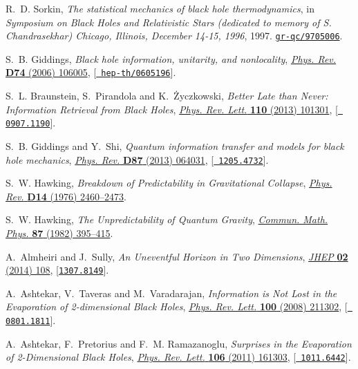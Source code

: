 \documentclass[12pt]{article}
\begin{document}
\begin{thebibliography}{100}
R.~D. Sorkin, \emph{{The statistical mechanics of black hole thermodynamics}},
  in \emph{{Symposium on Black Holes and Relativistic Stars (dedicated to
  memory of S. Chandrasekhar) Chicago, Illinois, December 14-15, 1996}}, 1997.
\newblock \href{http://arxiv.org/abs/gr-qc/9705006}{{\tt gr-qc/9705006}}.

S.~B. Giddings, \emph{{Black hole information, unitarity, and nonlocality}},
  \href{http://dx.doi.org/10.1103/PhysRevD.74.106005}{\emph{Phys. Rev.} {\bf
  D74} (2006) 106005}, [\href{http://arxiv.org/abs/hep-th/0605196}{{\tt
  hep-th/0605196}}].

S.~L. Braunstein, S.~Pirandola and K.~Życzkowski, \emph{{Better Late than
  Never: Information Retrieval from Black Holes}},
  \href{http://dx.doi.org/10.1103/PhysRevLett.110.101301}{\emph{Phys. Rev.
  Lett.} {\bf 110} (2013) 101301}, [\href{http://arxiv.org/abs/0907.1190}{{\tt
  0907.1190}}].

S.~B. Giddings and Y.~Shi, \emph{{Quantum information transfer and models for
  black hole mechanics}},
  \href{http://dx.doi.org/10.1103/PhysRevD.87.064031}{\emph{Phys. Rev.} {\bf
  D87} (2013) 064031}, [\href{http://arxiv.org/abs/1205.4732}{{\tt
  1205.4732}}].

S.~W. Hawking, \emph{{Breakdown of Predictability in Gravitational Collapse}},
  \href{http://dx.doi.org/10.1103/PhysRevD.14.2460}{\emph{Phys. Rev.} {\bf D14}
  (1976) 2460--2473}.

S.~W. Hawking, \emph{{The Unpredictability of Quantum Gravity}},
  \href{http://dx.doi.org/10.1007/BF01206031}{\emph{Commun. Math. Phys.} {\bf
  87} (1982) 395--415}.

A.~Almheiri and J.~Sully, \emph{{An Uneventful Horizon in Two Dimensions}},
  \href{http://dx.doi.org/10.1007/JHEP02(2014)108}{\emph{JHEP} {\bf 02} (2014)
  108}, [\href{http://arxiv.org/abs/1307.8149}{{\tt 1307.8149}}].

A.~Ashtekar, V.~Taveras and M.~Varadarajan, \emph{{Information is Not Lost in
  the Evaporation of 2-dimensional Black Holes}},
  \href{http://dx.doi.org/10.1103/PhysRevLett.100.211302}{\emph{Phys. Rev.
  Lett.} {\bf 100} (2008) 211302}, [\href{http://arxiv.org/abs/0801.1811}{{\tt
  0801.1811}}].

A.~Ashtekar, F.~Pretorius and F.~M. Ramazanoglu, \emph{{Surprises in the
  Evaporation of 2-Dimensional Black Holes}},
  \href{http://dx.doi.org/10.1103/PhysRevLett.106.161303}{\emph{Phys. Rev.
  Lett.} {\bf 106} (2011) 161303}, [\href{http://arxiv.org/abs/1011.6442}{{\tt
  1011.6442}}].


\end{thebibliography}
\end{document}
